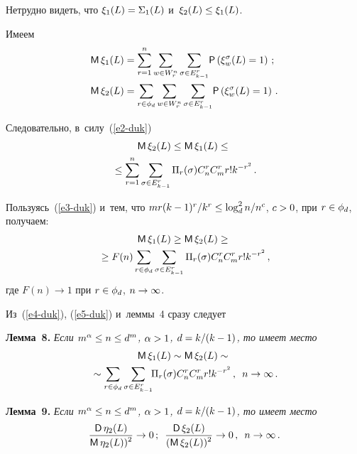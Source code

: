 \begin{multicols}{2}
    Нетрудно видеть, что $\xi_1(L)\hm=\Sigma_1(L)$ и~$\xi_2(L)\hm\leq \xi_1(L)$.
    
    Имеем 
    \begin{align*}
    {\sf M}\,\xi_1(L) &= \sum\limits^n_{r=1} \sum\limits_{w\in W_r^n} 
\sum\limits_{\sigma\in E^r_{k-1}} \!{\sf P}\left( \xi_w^\sigma(L)=1\right)\,;\\
    {\sf M}\,\xi_2(L) &= \sum\limits_{r\in \phi_d} \sum\limits_{w\in W_r^n} 
\sum\limits_{\sigma\in E^r_{k-1}} \!{\sf P}\left( \xi_w^\sigma(L)=1\right)\,.
    \end{align*}
    
    Следовательно, в~силу~(\ref{e2-duk}) 
    \begin{multline}
    {\sf M}\,\xi_2(L)\leq {\sf M}\,\xi_1(L)\leq {}\\
    {}\leq \sum\limits^n_{r=1} 
\sum\limits_{\sigma\in E^r_{k-1}} \Pi_r(\sigma) C_n^r C_m^r r! k^{-r^2}\,.
    \label{e4-duk}
    \end{multline}
    
    Пользуясь~(\ref{e3-duk}) и~тем, что $mr(k\hm-1)^r/k^r\hm\leq \log_d^2 
n/n^c$, $c\hm>0$, при $r\hm\in \phi_d$, получаем:
    \begin{multline}
    {\sf M}\,\xi_1(L)\geq {\sf M}\,\xi_2(L)\geq{}\\
    {}\geq F(n) \sum\limits_{r\in 
\phi_d}\sum\limits_{\sigma\in E^r_{k-1}} \Pi_r(\sigma) C_n^r C_m^r r! k^{-r^2}\,,
    \label{e5-duk}
    \end{multline}
    где $F(n)\to 1$ при $r\hm\in \phi_d$, $n\hm\to \infty$.
    
    Из~(\ref{e4-duk}), (\ref{e5-duk}) и~леммы~4 сразу следует 
    
    \smallskip
    
    \noindent
    \textbf{Лемма~8.} \textit{Если $m^\alpha\hm\leq n\hm\leq d^m$, 
$\alpha\hm>1$, $d\hm= k/(k\hm-1)$, то имеет место}
   \begin{multline*}
    {\sf M}\,\xi_1(L) \sim {\sf M}\,\xi_2(L)\sim{}\\
    {}\sim \sum\limits_{r\in \phi_d} 
\sum\limits_{\sigma\in E^r_{k-1}}\!\! \Pi_r(\sigma) C_n^r C_m^r r! k^{-r^2}\,,\enskip 
n\to \infty\,.
\end{multline*}
    
    \smallskip
    
    \noindent
    \textbf{Лемма~9.} \textit{Если $m^\alpha\hm\leq n\hm\leq d^m$, 
$\alpha\hm>1$, $d\hm= k/(k\hm-1)$, то имеет место}
$$
    \displaystyle\frac{\displaystyle {\sf D}\,\eta_2(L)\mathstrut}{\displaystyle {\sf M}\,\eta_2(L))^2\mathstrut}\to 0\,;\enskip
    \displaystyle\frac{\displaystyle {\sf D}\,\xi_2(L)\mathstrut}{\displaystyle ({\sf M}\,\xi_2(L))^2\mathstrut}\to 0\,,\enskip n\to \infty\,.
    $$
    

\end{multicols}
